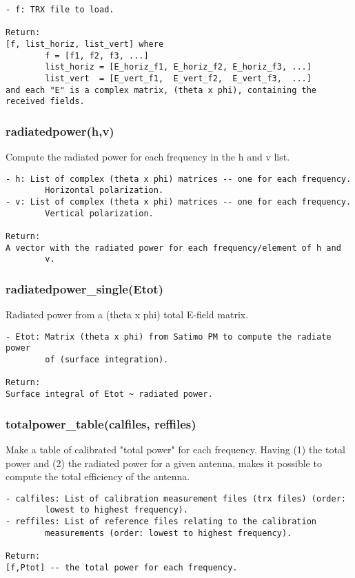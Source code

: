 \begin{verbatim}
- f: TRX file to load.

Return:
[f, list_horiz, list_vert] where
        f = [f1, f2, f3, ...]
        list_horiz = [E_horiz_f1, E_horiz_f2, E_horiz_f3, ...]
        list_vert  = [E_vert_f1,  E_vert_f2,  E_vert_f3,  ...]
and each "E" is a complex matrix, (theta x phi), containing the received fields.
\end{verbatim}

\subsubsection{radiatedpower(h,v)}
Compute the radiated power for each frequency in the h and v list.

\begin{verbatim}
- h: List of complex (theta x phi) matrices -- one for each frequency.
        Horizontal polarization.
- v: List of complex (theta x phi) matrices -- one for each frequency.
        Vertical polarization.

Return:
A vector with the radiated power for each frequency/element of h and
        v.
\end{verbatim}

\subsubsection{radiatedpower\_single(Etot)}
Radiated power from a (theta x phi) total E-field matrix.

\begin{verbatim}
- Etot: Matrix (theta x phi) from Satimo PM to compute the radiate power
        of (surface integration).

Return:
Surface integral of Etot ~ radiated power.
\end{verbatim}

\subsubsection{totalpower\_table(calfiles, reffiles)}
Make a table of calibrated "total power" for each frequency.
Having (1) the total power and (2) the radiated power for a given antenna,
makes it possible to compute the total efficiency of the antenna.

\begin{verbatim}
- calfiles: List of calibration measurement files (trx files) (order:
        lowest to highest frequency).
- reffiles: List of reference files relating to the calibration
        measurements (order: lowest to highest frequency).

Return:
[f,Ptot] -- the total power for each frequency.
\end{verbatim}

